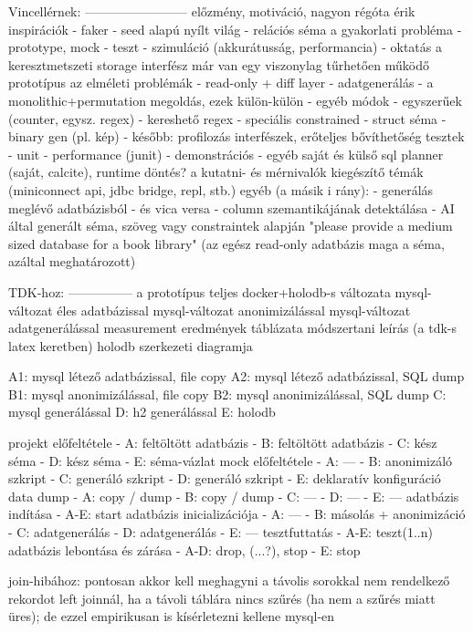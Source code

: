 \documentclass[
    parspace,
    noindent,
    nohyp,
]{elteiktdk}[2023/04/10]
\begin{document}
{Vincellérnek:
------------------------
előzmény, motiváció, nagyon régóta érik
inspirációk
  - faker
  - seed alapú nyílt világ
  - relációs séma
a gyakorlati probléma
  - prototype, mock
  - teszt
  - szimuláció (akkurátusság, performancia)
  - oktatás
a keresztmetszeti storage interfész
már van egy viszonylag tűrhetően működő prototípus
az elméleti problémák
  - read-only + diff layer
  - adatgenerálás
     - a monolithic+permutation megoldás, ezek külön-külön
     - egyéb módok
         - egyszerűek (counter, egysz. regex)
         - kereshető regex
         - speciális constrained
         - struct séma
         - binary gen (pl. kép)
  - később: profilozás
interfészek, erőteljes bővíthetőség
tesztek
  - unit
  - performance (junit)
  - demonstrációs
  - egyéb
saját és külső sql planner (saját, calcite), runtime döntés?
a kutatni- és mérnivalók
kiegészítő témák (miniconnect api, jdbc bridge, repl, stb.)
egyéb (a másik i rány):
   - generálás meglévő adatbázisból
      - és vica versa
      - column szemantikájának detektálása
   - AI által generált séma, szöveg vagy constraintek alapján
     "please provide a medium sized database for a book library"
        (az egész read-only adatbázis maga a séma, azáltal meghatározott)

TDK-hoz:
---------------
a prototípus teljes docker+holodb-s változata
mysql-változat éles adatbázissal
mysql-változat anonimizálással
mysql-változat adatgenerálással
measurement
eredmények táblázata
módszertani leírás (a tdk-s latex keretben)
holodb szerkezeti diagramja

A1: mysql létező adatbázissal, file copy
A2: mysql létező adatbázissal, SQL dump
B1: mysql anonimizálással, file copy
B2: mysql anonimizálással, SQL dump
C: mysql generálással
D: h2 generálással
E: holodb

projekt előfeltétele
- A: feltöltött adatbázis
- B: feltöltött adatbázis
- C: kész séma
- D: kész séma
- E: séma-vázlat
mock előfeltétele
- A: ---
- B: anonimizáló szkript
- C: generáló szkript
- D: generáló szkript
- E: deklaratív konfiguráció
data dump
- A: copy / dump
- B: copy / dump
- C: ---
- D: ---
- E: ---
adatbázis indítása
- A-E: start
adatbázis inicializációja
- A: ---
- B: másolás + anonimizáció
- C: adatgenerálás
- D: adatgenerálás
- E: ---
tesztfuttatás
- A-E: teszt(1..n)
adatbázis lebontása és zárása
- A-D: drop, (...?), stop
- E: stop

join-hibához:
pontosan akkor kell meghagyni a távolis sorokkal nem rendelkező rekordot left joinnál, ha a távoli táblára nincs szűrés (ha nem a szűrés miatt üres); de ezzel empirikusan is kísérletezni kellene mysql-en

}
\end{document}
